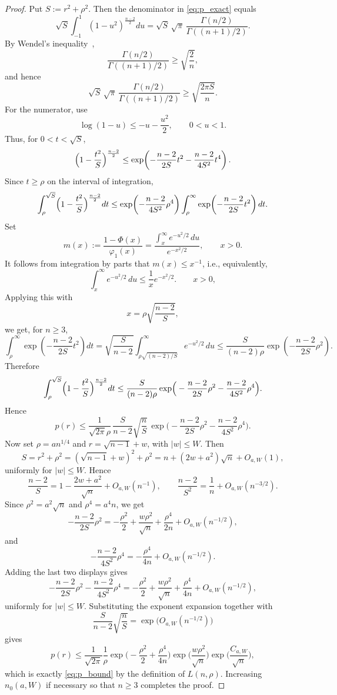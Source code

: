 \documentclass[11pt]{article}
\begin{document}
\begin{proof}
Put $S:=r^2+\rho^2$. Then the denominator in \eqref{eq:p_exact} equals
\[
\sqrt S\int_{-1}^{1}(1-u^2)^{\frac{n-2}{2}}du
=
\sqrt S\,\sqrt\pi\,\frac{\Gamma(n/2)}{\Gamma((n+1)/2)}.
\]
By Wendel's inequality~\cite{Wendel1948},
\[
\frac{\Gamma(n/2)}{\Gamma((n+1)/2)}
\ge \sqrt{\frac{2}{n}},
\]
and hence
\[
\sqrt S\,\sqrt\pi\,\frac{\Gamma(n/2)}{\Gamma((n+1)/2)}
\ge \sqrt{\frac{2\pi S}{n}} .
\]
For the numerator, use
\[
\log(1-u)\le -u-\frac{u^2}{2},\qquad 0<u<1.
\]
Thus, for \(0<t<\sqrt S\),
\[
\Bigl(1-\frac{t^2}{S}\Bigr)^{\frac{n-2}{2}}
\le
\exp\!\left(
-\frac{n-2}{2S}t^2-\frac{n-2}{4S^2}t^4
\right).
\]
Since \(t\ge \rho\) on the interval of integration,
\[
\int_{\rho}^{\sqrt S}
\Bigl(1-\frac{t^2}{S}\Bigr)^{\frac{n-2}{2}}dt
\le
\exp\!\left(-\frac{n-2}{4S^2}\rho^4\right)
\int_{\rho}^{\infty}
\exp\!\left(-\frac{n-2}{2S}t^2\right)dt .
\]
Set 
\[
m(x):=\frac{1-\Phi(x)}{\varphi_1(x)}
=
\frac{\int_x^\infty e^{-u^2/2}\,du}{e^{-x^2/2}},
\qquad x>0.
\]
It follows from integration by parts that  \(m(x)\le x^{-1}\), i.e.,  equivalently,
\[
\int_x^\infty e^{-u^2/2}\,du\le \frac{1}{x}e^{-x^2/2}.
\qquad x>0,
\]
 Applying this with
\[
x=\rho\sqrt{\frac{n-2}{S}},
\]
we get, for \(n\ge3\),
\[
\int_{\rho}^{\infty}
\exp\!\left(-\frac{n-2}{2S}t^2\right)dt
=
\sqrt{\frac{S}{n-2}}
\int_{\rho\sqrt{(n-2)/S}}^\infty e^{-u^2/2}\,du
\le
\frac{S}{(n-2)\rho}
\exp\!\left(-\frac{n-2}{2S}\rho^2\right).
\]
Therefore
\[
\int_{\rho}^{\sqrt S}
\Bigl(1-\frac{t^2}{S}\Bigr)^{\frac{n-2}{2}}dt
\le
\frac{S}{(n-2)\rho}
\exp\!\Big(
-\frac{n-2}{2S}\rho^2-\frac{n-2}{4S^2}\rho^4
\Big).
\] Hence
\[
p(r)\le
\frac{1}{\sqrt{2\pi}\rho}\,
\frac{S}{n-2}\sqrt{\frac{n}{S}}\,
\exp\!\Big(
-\frac{n-2}{2S}\rho^2-\frac{n-2}{4S^2}\rho^4
\Big).
\]
Now set $\rho=a n^{1/4}$ and $r=\sqrt{n-1}+w$, with $|w|\le W$. Then
\[
S=r^2+\rho^2
=(\sqrt{n-1}+w)^2+\rho^2
=n+(2w+a^2)\sqrt n+O_{a,W}(1),
\]
uniformly for $|w|\le W$. Hence
\[
\frac{n-2}{S}
=
1-\frac{2w+a^2}{\sqrt n}+O_{a,W}(n^{-1}),
\qquad
\frac{n-2}{S^2}
=
\frac1n+O_{a,W}(n^{-3/2}).
\]
Since $\rho^2=a^2\sqrt n$ and $\rho^4=a^4 n$, we get
\[
-\frac{n-2}{2S}\rho^2
=
-\frac{\rho^2}{2}
+\frac{w\rho^2}{\sqrt n}
+\frac{\rho^4}{2n}
+O_{a,W}(n^{-1/2}),
\]
and
\[
-\frac{n-2}{4S^2}\rho^4
=
-\frac{\rho^4}{4n}
+O_{a,W}(n^{-1/2}).
\]
Adding the last two displays gives
\[
-\frac{n-2}{2S}\rho^2-\frac{n-2}{4S^2}\rho^4
=
-\frac{\rho^2}{2}
+\frac{w\rho^2}{\sqrt n}
+\frac{\rho^4}{4n}
+O_{a,W}(n^{-1/2}),
\]
uniformly for $|w|\le W$. Substituting the exponent expansion together with
\[
\frac{S}{n-2}\sqrt{\frac{n}{S}}
=
\exp\bigl(O_{a,W}(n^{-1/2})\bigr)
\]
gives
\[
p(r)\le
\frac{1}{\sqrt{2\pi}}\frac1\rho
\exp\!\Big(-\frac{\rho^2}{2}+\frac{\rho^4}{4n}\Big)
\exp\!\Big(\frac{w\rho^2}{\sqrt n}\Big)
\exp\!\Big(\frac{C_{a,W}}{\sqrt n}\Big),
\]
which is exactly \eqref{eq:p_bound} by the definition of $L(n,\rho)$. Increasing
$n_0(a,W)$ if necessary so that $n\ge3$ completes the proof.
\end{proof}
\end{document}
